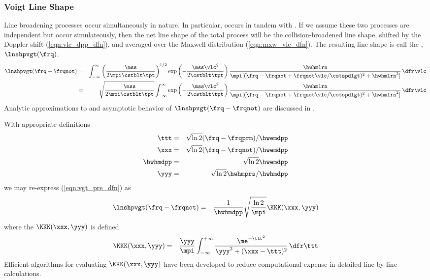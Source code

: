 \documentclass[12pt]{article}
\begin{document}
\subsubsection[Voigt Line Shape]{Voigt Line Shape}\label{sxn:lnshp_vgt}
Line broadening processes occur simultaneously in nature. 
In particular,  occurs in tandem with  
.
If we assume these two processes are independent but occur
simulateously, then the net line shape of the total process will be
the collision-broadened line shape, shifted by the Doppler shift
(\ref{eqn:vlc_dpp_dfn}),  and averaged over the Maxwell distribution
(\ref{eqn:mxw_vlc_dfn}).
The resulting line shape is call the ,
$\lnshpvgt(\frq)$. 
\begin{eqnarray}
\lnshpvgt(\frq-\frqnot) & = & 
\int_{-\infty}^{\infty} 
\left( \frac{\mss}{2\mpi \cstblt \tpt} \right)^{1/2} 
\exp \left( - \frac{\mss \vlc^{2}}{2 \cstblt \tpt} \right) 
\frac{\hwhmlrn}{\mpi [ (\frq - \frqnot + \frqnot \vlc / \cstspdlgt )^{2} + \hwhmlrn^{2} ] }
\,\dfr\vlc \\
& = & 
\sqrt{ \frac{\mss}{2\mpi \cstblt \tpt} }
\int_{-\infty}^{\infty} 
\exp \left( - \frac{\mss \vlc^{2}}{2 \cstblt \tpt} \right) 
\frac{\hwhmlrn}{\mpi [ (\frq - \frqnot + \frqnot \vlc / \cstspdlgt )^{2} + \hwhmlrn^{2} ] }
\,\dfr\vlc
\label{eqn:vgt_pre_dfn}
\end{eqnarray}
Analytic approximations to and asymptotic behavior of
$\lnshpvgt(\frq-\frqnot)$ are discussed in \cite{GoY89,Lio92}.

With appropriate definitions \cite[e.g.,][p.30]{Lio92}
\begin{eqnarray}
\ttt & = & \sqrt{\ln 2} (\frq - \frqprm)/\hwemdpp \nonumber \\
\xxx & = & \sqrt{\ln 2} (\frq - \frqnot)/\hwemdpp \nonumber \\
\hwhmdpp & = & \sqrt{\ln 2} \hwemdpp \nonumber \\
\yyy & = & \sqrt{\ln 2} \hwhmprs / \hwhmdpp
\label{eqn:vgt_cov}
\end{eqnarray}
we may re-express (\ref{eqn:vgt_pre_dfn}) as
\begin{eqnarray}
\lnshpvgt(\frq-\frqnot) & = & 
\frac{1}{\hwhmdpp} \sqrt{\frac{\ln 2}{\mpi}} \KKK(\xxx,\yyy)
\label{eqn:vgt_err_fnc_cpx}
\end{eqnarray}
where the  $\KKK(\xxx,\yyy)$ is defined
\begin{eqnarray}
\KKK(\xxx,\yyy) & = &
\frac{\yyy}{\mpi} \int_{-\infty}^{+\infty} 
\frac{\me^{-\ttt^{2}}}{\yyy^{2}+(\xxx-\ttt)^{2}} \,\dfr\ttt
\label{eqn:err_fnc_cpx_dfn}
\end{eqnarray}
Efficient algorithms for evaluating $\KKK(\xxx,\yyy)$ have been
developed \cite[]{HAW78,Hum82,Kun97} to reduce computational expense
in detailed line-by-line calculations.
\end{document}
